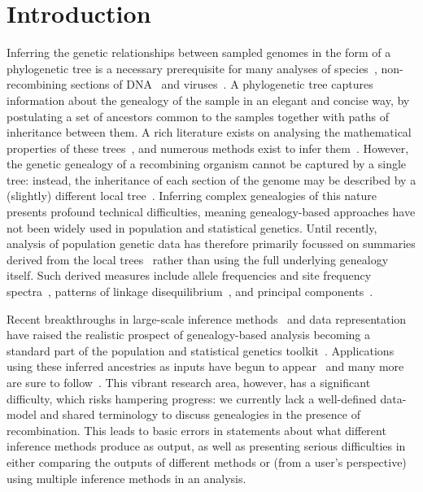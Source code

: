 \documentclass{article}
\begin{document}
\section*{Introduction}
Inferring the genetic relationships between sampled genomes in the form of a
phylogenetic tree is a necessary prerequisite for many analyses of
species~\citep{rannala2003genetics}, non-recombining sections of
DNA~\citep{cann1987mitochondrial,underhill2001annalsofhumangenetics}
and viruses~\citep{grenfell2004science}.
A phylogenetic tree captures information about the genealogy
of the sample in an elegant and concise
way, by postulating a set of ancestors common to the samples
together with paths of inheritance between them. A rich literature exists
on analysing the mathematical properties of these
trees~\citep{steel2016phylogeny}, and numerous
methods exist to infer them~\citep{felsenstein2004inferring}.
However, the genetic genealogy of a recombining organism
cannot be captured by a single tree: instead,
the inheritance of each section of the genome may be described
by a (slightly) different local tree~\citep{hudson1983properties}.
Inferring complex
genealogies of this nature
presents profound technical difficulties, meaning genealogy-based approaches have
not been widely used in population and statistical genetics.
Until recently, analysis of
population genetic data has therefore primarily focussed on summaries derived
from the local trees~\citep{tajima1983evolutionary,tavare1984line}
rather than using the full underlying genealogy itself. Such
derived measures include allele frequencies and site frequency
spectra~\citep{achaz2009frequency,ralph2020efficiently},
patterns of linkage disequilibrium~\citep{mcvean2002genealogical}, and
principal components~\citep{mcvean2009genealogical}.

Recent breakthroughs in large-scale inference
methods~\citep{rasmussen2014genome,kelleher2019inferring,speidel2019method,wohns2022unified}
and data representation~\citep{kelleher2016efficient}
have raised the realistic prospect of genealogy-based analysis becoming a standard part
of the population and statistical genetics toolkit~\citep{hejase2020summary}.
Applications using these inferred ancestries as inputs have begun to
appear~\citep{osmond2021estimating,zhang2021biobank,fan2022genealogical,hejase2022deep}
and many more are sure to
follow~\citep{harris2019database}. This vibrant research area, however,
has a significant difficulty, which risks hampering
progress: we currently lack a well-defined data-model and shared terminology
to discuss genealogies in the presence of recombination. This leads to basic errors in statements
about what different inference methods produce as output, as well as presenting serious
difficulties in either comparing the outputs of different methods or
(from a user's perspective) using multiple inference methods in an analysis.
\end{document}
